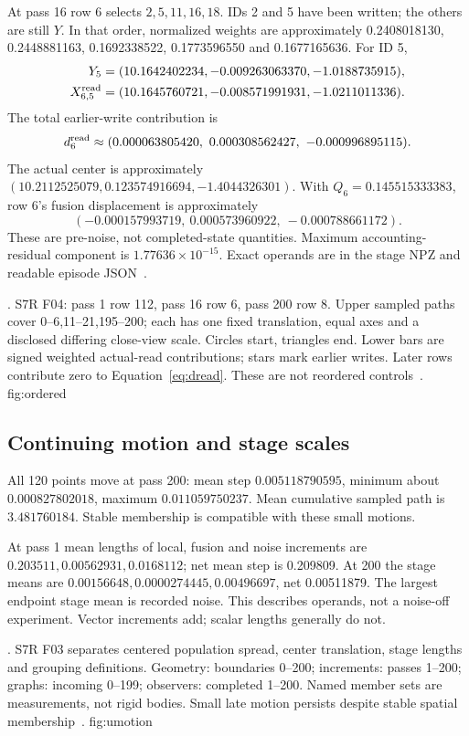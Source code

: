 At pass 16 row 6 selects \(2,5,11,16,18\). IDs 2 and 5 have been written; the others are still \(Y\). In that order, normalized weights are approximately 0.2408018130, 0.2448881163, 0.1692338522, 0.1773596550 and 0.1677165636. For ID 5,
\begin{align*}
Y_5&=(10.1642402234,-0.009263063370,-1.0188735915),\\
X^{\rm read}_{6,5}&=(10.1645760721,-0.008571991931,-1.0211011336).
\end{align*}
The total earlier-write contribution is
\[
d_6^{\rm read}\approx(0.000063805420,\ 0.000308562427,\ -0.000996895115).
\]
The actual center is approximately \((10.2112525079,0.123574916694,-1.4044326301)\). With \(Q_6=0.145515333383\), row 6's fusion displacement is approximately
\[
(-0.000157993719,\ 0.000573960922,\ -0.000788661172).
\]
These are pre-noise, not completed-state quantities. Maximum accounting-residual component is \(1.77636\times10^{-15}\). Exact operands are in the stage NPZ and readable episode JSON~\citep{s7rordered,s7rreview}.

{. S7R F04: pass 1 row 112, pass 16 row 6, pass 200 row 8. Upper sampled paths cover 0--6,11--21,195--200; each has one fixed translation, equal axes and a disclosed differing close-view scale. Circles start, triangles end. Lower bars are signed weighted actual-read contributions; stars mark earlier writes. Later rows contribute zero to Equation~\eqref{eq:dread}. These are not reordered controls~\citep{s7rordered}.}
{fig:ordered}

\subsection{Continuing motion and stage scales}
All 120 points move at pass 200: mean step \(0.005118790595\), minimum about \(0.000827802018\), maximum \(0.011059750237\). Mean cumulative sampled path is \(3.481760184\). Stable membership is compatible with these small motions.

At pass 1 mean lengths of local, fusion and noise increments are \(0.203511,0.00562931,0.0168112\); net mean step is 0.209809. At 200 the stage means are \(0.00156648,0.0000274445,0.00496697\), net 0.00511879. The largest endpoint stage mean is recorded noise. This describes operands, not a noise-off experiment. Vector increments add; scalar lengths generally do not.

{. S7R F03 separates centered population spread, center translation, stage lengths and grouping definitions. Geometry: boundaries 0--200; increments: passes 1--200; graphs: incoming 0--199; observers: completed 1--200. Named member sets are measurements, not rigid bodies. Small late motion persists despite stable spatial membership~\citep{s7rmotion}.}
{fig:umotion}

